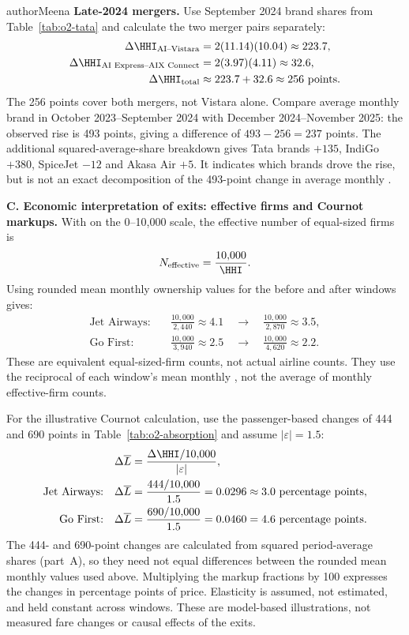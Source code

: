 \begin{authorcontribution}{authorMeena}
\textbf{Late-2024 mergers.} Use September 2024 brand shares from Table~\ref{tab:o2-tata} and calculate the two merger pairs separately:
\[
\begin{aligned}
\Delta\HHI_{\text{AI--Vistara}} &= 2(11.14)(10.04) \approx 223.7,\\
\Delta\HHI_{\text{AI Express--AIX Connect}} &= 2(3.97)(4.11) \approx 32.6,\\
\Delta\HHI_{\text{total}} &\approx 223.7+32.6 \approx 256\text{ points}.
\end{aligned}
\]
The 256 points cover both mergers, not Vistara alone. Compare average monthly brand \HHI{} in October 2023--September 2024 with December 2024--November 2025: the observed rise is 493 points, giving a difference of $493-256=237$ points. The additional squared-average-share breakdown gives Tata brands $+135$, IndiGo $+380$, SpiceJet $-12$ and Akasa Air $+5$. It indicates which brands drove the rise, but is not an exact decomposition of the 493-point change in average monthly \HHI{}.

\textbf{C. Economic interpretation of exits: effective firms and Cournot markups.}
With \HHI{} on the 0--10,000 scale, the effective number of equal-sized firms is
\[
N_{\text{effective}}=\frac{10{,}000}{\HHI}.
\]
Using rounded mean monthly ownership \HHI{} values for the before and after windows gives:
\[
\begin{aligned}
\text{Jet Airways:}\quad &\frac{10{,}000}{2{,}440}\approx4.1
\quad\longrightarrow\quad\frac{10{,}000}{2{,}870}\approx3.5,\\
\text{Go First:}\quad &\frac{10{,}000}{3{,}940}\approx2.5
\quad\longrightarrow\quad\frac{10{,}000}{4{,}620}\approx2.2.
\end{aligned}
\]
These are equivalent equal-sized-firm counts, not actual airline counts. They use the reciprocal of each window's mean monthly \HHI{}, not the average of monthly effective-firm counts.

For the illustrative Cournot calculation, use the passenger-based \HHI{} changes of 444 and 690 points in Table~\ref{tab:o2-absorption} and assume $|\varepsilon|=1.5$:
\[
\begin{aligned}
\Delta\overline{L}&=\frac{\Delta\HHI/10{,}000}{|\varepsilon|},\\
\text{Jet Airways:}\quad \Delta\overline{L}&=\frac{444/10{,}000}{1.5}
=0.0296\approx3.0\text{ percentage points},\\
\text{Go First:}\quad \Delta\overline{L}&=\frac{690/10{,}000}{1.5}
=0.0460=4.6\text{ percentage points}.
\end{aligned}
\]
The 444- and 690-point changes are calculated from squared period-average shares (part~A), so they need not equal differences between the rounded mean monthly \HHI{} values used above. Multiplying the markup fractions by 100 expresses the changes in percentage points of price. Elasticity is assumed, not estimated, and held constant across windows. These are model-based illustrations, not measured fare changes or causal effects of the exits.


\end{authorcontribution}
